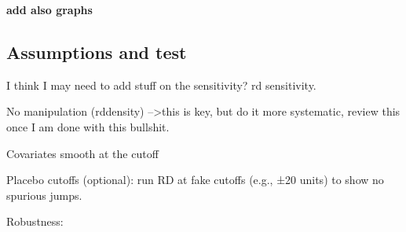 \documentclass{article}
\begin{document}
\textbf{add also graphs}



\subsection{Assumptions and test}

I think I may need to add stuff on the sensitivity? rd sensitivity. 

No manipulation (rddensity) -->this is key, but do it more systematic, review this once I am done with this bullshit.

Covariates smooth at the cutoff

Placebo cutoffs (optional): run RD at fake cutoffs (e.g., ±20 units) to show no spurious jumps.

Robustness:
\end{document}
